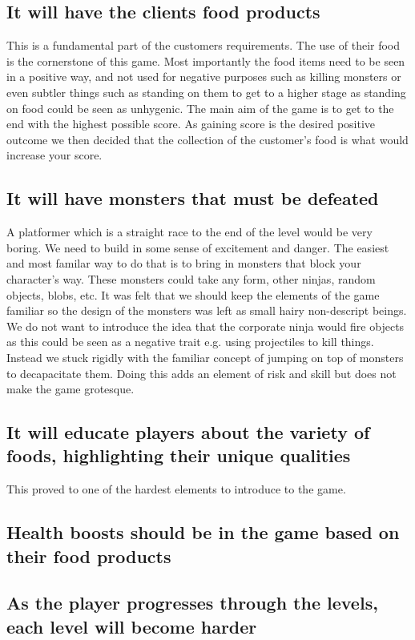 \documentclass{article}
\begin{document}
\subsection{ It will have the clients food products }
This is a fundamental part of the customers requirements. The use of their food is the cornerstone of this game.
Most importantly the food items need to be seen in a positive way, and not used for negative purposes such as killing monsters or even subtler things such as standing on them to get to a higher stage as standing on food could be seen as unhygenic. 
The main aim of the game is to get to the end with the highest possible score. As gaining score is the desired positive outcome we then decided that the collection of the customer's food is what would increase your score.

\subsection{ It will have monsters that must be defeated }
A platformer which is a straight race to the end of the level would be very boring. We need to build in some sense of excitement and danger. The easiest and most familar way to do that is to bring in monsters that block your character's way. These monsters could take any form, other ninjas, random objects, blobs, etc. It was felt that we should keep the elements of the game familiar so the design of the monsters was left as small hairy non-descript beings. 
We do not want to introduce the idea that the corporate ninja would fire objects as this could be seen as a negative trait e.g. using projectiles to kill things. Instead we stuck rigidly with the familiar concept of jumping on top of monsters to decapacitate them. Doing this adds an element of risk and skill but does not make the game grotesque.

\subsection{ It will educate players about the variety of foods, highlighting their unique qualities }
This proved to one of the hardest elements to introduce to the game.

\subsection{ Health boosts should be in the game based on their food products }
\subsection{ As the player progresses through the levels, each level will become harder }
\end{document}
